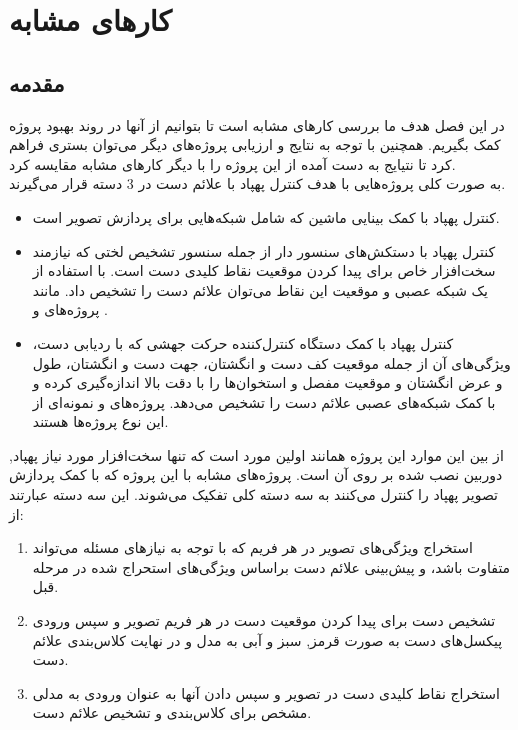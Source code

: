 \chapter{کار‌های مشابه}
\section{مقدمه}
در این فصل هدف ما بررسی کارهای مشابه است تا بتوانیم از آنها در روند بهبود پروژه کمک بگیریم. همچنین با توجه به نتایج و ارزیابی پروژه‌های دیگر می‌توان بستری فراهم کرد تا نتیایج به دست آمده از این پروژه را با دیگر کارهای مشابه مقایسه کرد.
\\
به صورت کلی پروژه‌هایی با هدف کنترل پهپاد با علائم دست در 3 دسته قرار می‌گیرند.
\begin{itemize}
    \item کنترل پهپاد با کمک بینایی ماشین که شامل شبکه‌هایی برای پردازش تصویر است. 
    \item کنترل پهپاد با دستکش‌های سنسور دار از جمله سنسور تشخیص لختی
      که نیازمند سخت‌افزار خاص برای پیدا کردن موقعیت نقاط کلیدی دست است. با استفاده از یک شبکه عصبی و موقعیت این نقاط می‌توان علائم دست را تشخیص داد. مانند پروژه‌های  \cite{yoo2022motion} و \cite{ma2017hand}.
    \item  کنترل پهپاد با کمک دستگاه کنترل‌کننده حرکت جهشی که با ردیابی دست، ویژگی‌های آن از جمله موقعیت کف دست و انگشتان، جهت دست و انگشتان، طول و عرض انگشتان و موقعیت مفصل و استخوان‌ها را با دقت بالا اندازه‌گیری کرده و با کمک شبکه‌های عصبی علائم دست را تشخیص می‌دهد. پروژه‌های
    \cite{hu2020deep} و \cite{sarkar2016gesture} نمونه‌ای از این نوع پروژه‌ها هستند. 
\end{itemize}

از بین این موارد این پروژه همانند اولین مورد است که تنها سخت‌افزار مورد نیاز پهپاد, دوربین نصب شده بر روی آن است. 
پروژه‌های مشابه با این پروژه که با کمک پردازش تصویر پهپاد را کنترل می‌‌کنند به سه دسته کلی تفکیک می‌شوند.
این سه دسته عبارتند از:
\begin{enumerate}
    \item استخراج ویژگی‌های تصویر در هر فریم که با توجه به نیاز‌های مسئله می‌تواند متفاوت باشد، و پیش‌بینی علائم دست براساس ویژگی‌های استحراج شده در مرحله قبل.
    \item تشخیص دست ‌برای پیدا کردن موقعیت دست در هر فریم تصویر و سپس ورودی پیکسل‌های دست به صورت قرمز, سبز و آبی
    به مدل و در نهایت کلاس‌بندی علائم دست.
    \item استخراج نقاط کلیدی  دست در تصویر و سپس دادن آنها به عنوان ورودی به مدلی مشخص برای کلاس‌بندی و تشخیص علائم دست.
\end{enumerate}

